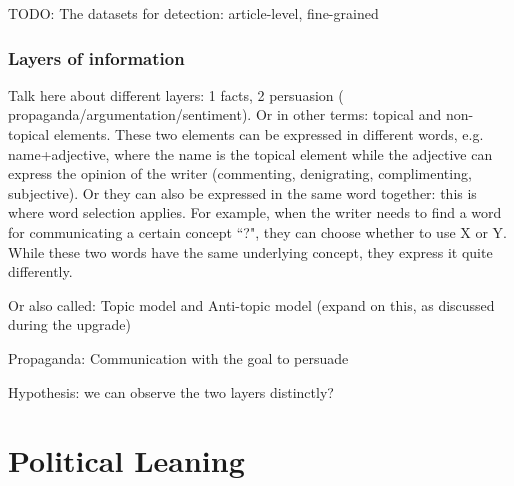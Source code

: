 
TODO: The datasets for detection: article-level, fine-grained

\subsubsection{Layers of information}
\label{ssec:lit_layers_of_info}

Talk here about different layers: 1 facts, 2 persuasion ( propaganda/argumentation/sentiment). Or in other terms: topical and non-topical elements.
These two elements can be expressed in different words, e.g. name+adjective, where the name is the topical element while the adjective can express the opinion of the writer (commenting, denigrating, complimenting, subjective).
Or they can also be expressed in the same word together: this is where word selection applies. For example, when the writer needs to find a word for communicating a certain concept ``?", they can choose whether to use X or Y. While these two words have the same underlying concept, they express it quite differently.

Or also called: Topic model and Anti-topic model (expand on this, as discussed during the upgrade)

Propaganda: Communication with the goal to persuade

Hypothesis: we can observe the two layers distinctly?

\section{Political Leaning}
\label{sec:lit_leaning}

